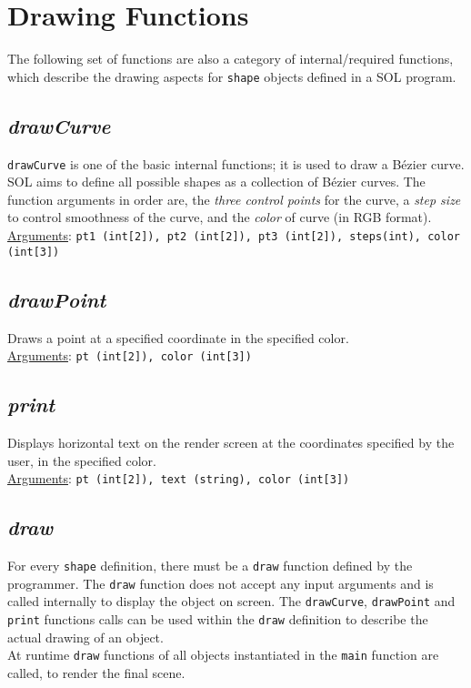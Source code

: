 \section{Drawing Functions}
The following set of functions are also a category of internal/required functions, which describe the drawing aspects for \texttt{shape} objects defined in a SOL program.

    \subsection{\textit{drawCurve}}
    \texttt{drawCurve} is one of the basic internal functions; it is used to draw a B\'ezier curve. SOL aims to define all possible shapes as a collection of B\'ezier curves. The function arguments in order are, the \textit{three control points} for the curve, a \textit{step size} to control smoothness of the curve, and the \textit{color} of curve (in RGB format).\\
    \underline{Arguments}: \texttt{pt1 (int[2]), pt2 (int[2]), pt3 (int[2]), steps(int), color (int[3])}

    \subsection{\textit{drawPoint}}
    Draws a point at a specified coordinate in the specified color.\\
    \underline{Arguments}: \texttt{pt (int[2]), color (int[3])}

    \subsection{\textit{print}}
    Displays horizontal text on the render screen at the coordinates specified by the user, in the specified color.\\
    \underline{Arguments}: \texttt{pt (int[2]), text (string), color (int[3])}

    \subsection{\textit{draw}}
    For every \texttt{shape} definition, there must be a \texttt{draw} function defined by the programmer. The \texttt{draw} function does not accept any input arguments and is called internally to display the object on screen. The \texttt{drawCurve}, \texttt{drawPoint} and \texttt{print} functions calls can be used within the \texttt{draw} definition to describe the actual drawing of an object.\\
    At runtime \texttt{draw} functions of all objects instantiated in the \texttt{main} function are called, to render the final scene.


